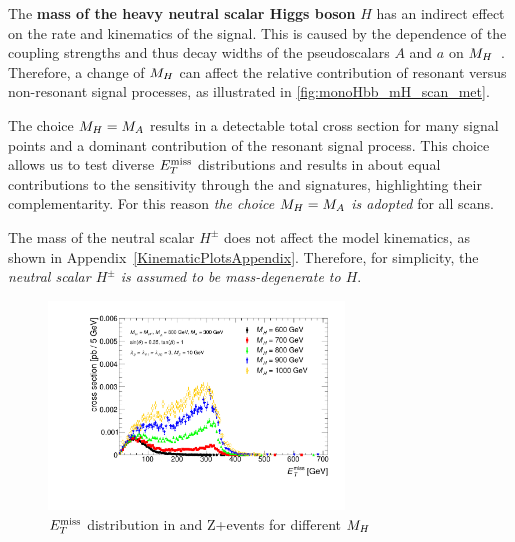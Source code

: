 The \textbf{mass of the heavy neutral scalar Higgs boson} $H$ has an indirect effect on the rate and kinematics of the signal. 
This is caused by the dependence of the coupling strengths and thus decay widths of  the pseudoscalars $A$ and $a$ on  $M_{H}$~\cite{Bauer:2017ota}. 
Therefore, a change of $M_{H}$ can affect the relative contribution of resonant versus non-resonant signal processes, as illustrated in \autoref{fig:monoHbb_mH_scan_met}.

The choice $M_{H} = M_{A}$ results in a detectable total cross section for many signal points and a dominant contribution of the resonant signal process. 
This choice allows us to test diverse $E_T^\mathrm{miss}$ distributions and results in about equal contributions to the sensitivity through the \monoz and \monoh signatures, highlighting their complementarity. For this reason \emph{the choice $M_{H} = M_{A}$ is adopted} for all scans. 

The mass of the neutral scalar $H^{\pm}$ does not affect the model kinematics, as shown in Appendix~\autoref{KinematicPlotsAppendix}. 
Therefore, for simplicity, the \emph{neutral scalar $H^{\pm}$ is assumed to be mass-degenerate to $H$}.


\begin{figure}[!htbp]
	\centering

	\includegraphics[width=0.7\textwidth]{texinputs/04_grid/figures/monoHbb_mH_scan_MET_liny.pdf}
	\caption{The \MET distribution, accounting for the production cross section, of \monohbb signal events for five representative choices of $\mH = \mHc$.
	\label{fig:monoHbb_mH_scan_met}} 
     
	\caption{$E_T^\mathrm{miss}$ distribution in \monohbb and Z+\MET events for different $M_{H}$}
\end{figure}

